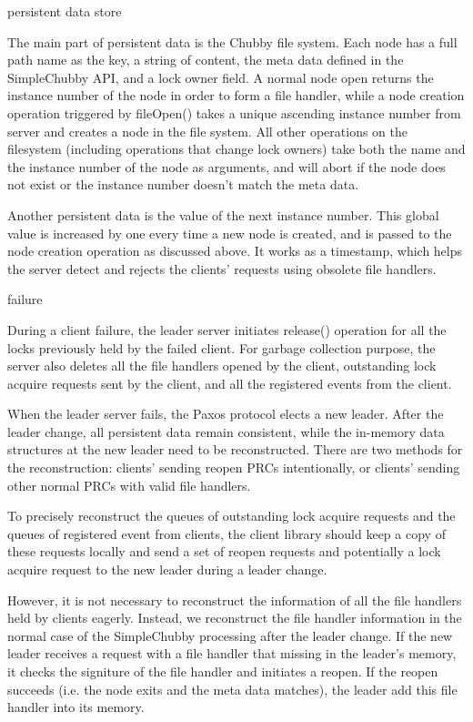persistent data store

The main part of persistent data is the Chubby file system. Each node has
a full path name as the key, a string of content, the meta data defined
in the SimpleChubby API, and a lock owner field. A normal node open returns
the instance number of the node in order to form a file handler, while
a node creation operation triggered by fileOpen() takes a unique ascending
instance number from server and creates a node in the file system. All other
operations on the filesystem (including operations that change lock owners)
take both the name and the instance number of the node as arguments, and will
abort if the node does not exist or the instance number doesn't match the
meta data.

Another persistent data is the value of the next instance number. This global
value is increased by one every time a new node is created, and is passed
to the node creation operation as discussed above. It works as a timestamp,
which helps the server detect and rejects the clients' requests using obsolete
file handlers.



failure

During a client failure, the leader server initiates release() operation for
all the locks previously held by the failed client. For garbage collection
purpose, the server also deletes all the file handlers opened by the client,
outstanding lock acquire requests sent by the client, and all the registered
events from the client.

When the leader server fails, the Paxos protocol elects a new leader. After
the leader change, all persistent data remain consistent, while the in-memory
data structures at the new leader need to be reconstructed. There are two
methods for the reconstruction: clients' sending reopen PRCs intentionally,
or clients' sending other normal PRCs with valid file handlers.

To precisely reconstruct the queues of outstanding lock acquire requests and
the queues of registered event from clients, the client library should keep
a copy of these requests locally and send a set of reopen requests and
potentially a lock acquire request to the new leader during a leader change.

However, it is not necessary to reconstruct the information of all the file
handlers held by clients eagerly. Instead, we reconstruct the file handler
information in the normal case of the SimpleChubby processing after the
leader change. If the new leader receives a request with a file handler that
missing in the leader's memory, it checks the signiture of the file
handler and initiates a reopen. If the reopen succeeds (i.e. the node exits
and the meta data matches), the leader add this file handler into its memory.



